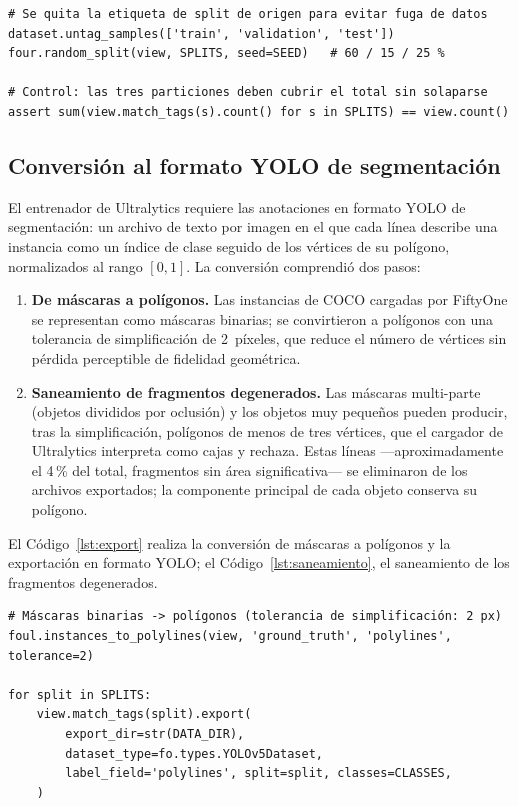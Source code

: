 \documentclass[11pt,a4paper]{article}
\begin{document}
\begin{lstlisting}[style=py,caption={Partición reproducible 60/15/25\,\% a
nivel de imagen, con control de integridad (particiones disjuntas y
exhaustivas).},label={lst:split}]
# Se quita la etiqueta de split de origen para evitar fuga de datos
dataset.untag_samples(['train', 'validation', 'test'])
four.random_split(view, SPLITS, seed=SEED)   # 60 / 15 / 25 %

# Control: las tres particiones deben cubrir el total sin solaparse
assert sum(view.match_tags(s).count() for s in SPLITS) == view.count()
\end{lstlisting}

\subsection{Conversión al formato YOLO de segmentación}

El entrenador de Ultralytics requiere las anotaciones en formato YOLO de
segmentación: un archivo de texto por imagen en el que cada línea describe una
instancia como un índice de clase seguido de los vértices de su polígono,
normalizados al rango $[0,1]$. La conversión comprendió dos pasos:

\begin{enumerate}
  \item \textbf{De máscaras a polígonos.} Las instancias de COCO cargadas por
  FiftyOne se representan como máscaras binarias; se convirtieron a polígonos
  con una tolerancia de simplificación de 2~píxeles, que reduce el número de
  vértices sin pérdida perceptible de fidelidad geométrica.
  \item \textbf{Saneamiento de fragmentos degenerados.} Las máscaras
  multi-parte (objetos divididos por oclusión) y los objetos muy pequeños
  pueden producir, tras la simplificación, polígonos de menos de tres
  vértices, que el cargador de Ultralytics interpreta como cajas y rechaza.
  Estas líneas ---aproximadamente el 4\,\% del total, fragmentos sin área
  significativa--- se eliminaron de los archivos exportados; la componente
  principal de cada objeto conserva su polígono.
\end{enumerate}

El Código~\ref{lst:export} realiza la conversión de máscaras a polígonos y la
exportación en formato YOLO; el Código~\ref{lst:saneamiento}, el saneamiento
de los fragmentos degenerados.

\begin{lstlisting}[style=py,caption={Conversión de máscaras de instancia a
polígonos y exportación de las tres particiones al formato YOLO de
segmentación.},label={lst:export}]
# Máscaras binarias -> polígonos (tolerancia de simplificación: 2 px)
foul.instances_to_polylines(view, 'ground_truth', 'polylines', tolerance=2)

for split in SPLITS:
    view.match_tags(split).export(
        export_dir=str(DATA_DIR),
        dataset_type=fo.types.YOLOv5Dataset,
        label_field='polylines', split=split, classes=CLASSES,
    )
\end{lstlisting}
\end{document}
